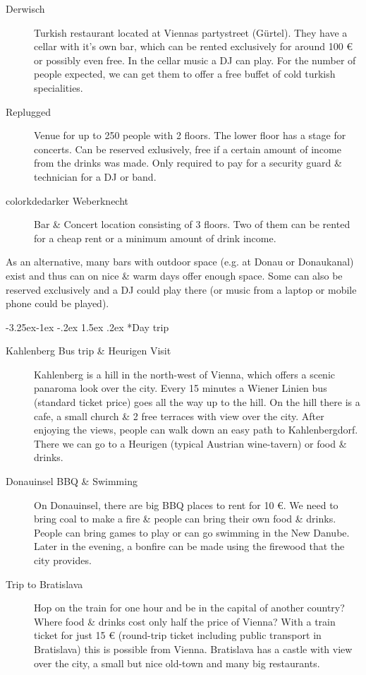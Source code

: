 \documentclass[10pt,a4paper]{article}
\makeatletter
\renewcommand\subsection{%
\@startsection{subsection}{2}{\z@}%
              {-3.25ex\@plus -1ex \@minus -.2ex}%
              {1.5ex \@plus .2ex}%
              {\color{kdelight}\sffamily\Large\bfseries}}
\makeatother
\begin{document}
\begin{description}
\item[\color{kdedarker} Derwisch] Turkish restaurant located at Viennas partystreet (Gürtel). They have a cellar with it's own bar, which can be rented exclusively for around 100 \euro{} or possibly even free. In the cellar music a DJ can play. For the number of people expected, we can get them to offer a free buffet of cold turkish specialities. 
\item[\color{kdedarker} Replugged] Venue for up to 250 people with 2 floors. The lower floor has a stage for concerts. Can be reserved exlusively, free if a certain amount of income from the drinks was made. Only required to pay for a security guard \& technician for a DJ or band.
\item[color{kdedarker} Weberknecht] Bar \& Concert location consisting of 3 floors. Two of them can be rented for a cheap rent or a minimum amount of drink income.
\end{description}

As an alternative, many bars with outdoor space (e.g. at Donau or Donaukanal) exist and thus can on nice \& warm days offer enough space. Some can also be reserved exclusively and a DJ could play there (or music from a laptop or mobile phone could be played).


\subsection*{Day trip}
\begin{description}
\item[\color{kdedarker} Kahlenberg Bus trip \& Heurigen Visit] Kahlenberg is a hill in the north-west of Vienna, which offers a scenic panaroma look over the city. Every 15 minutes a Wiener Linien bus (standard ticket price) goes all the way up to the hill. On the hill there is a cafe, a small church \& 2 free terraces with view over the city. After enjoying the views, people can walk down an easy path to Kahlenbergdorf. There we can go to a Heurigen (typical Austrian wine-tavern) or food \& drinks.
\item[\color{kdedarker} Donauinsel BBQ \& Swimming] On Donauinsel, there are big BBQ places to rent for 10 \euro{}. We need to bring coal to make a fire \& people can bring their own food \& drinks. People can bring games to play or can go swimming in the New Danube. Later in the evening, a bonfire can be made using the firewood that the city provides.
\item[\color{kdedarker} Trip to Bratislava] Hop on the train for one hour and be in the capital of another country? Where food \& drinks cost only half the price of Vienna? With a train ticket for just 15 \euro{} (round-trip ticket including public transport in Bratislava) this is possible from Vienna. Bratislava has a castle with view over the city, a small but nice old-town and many big restaurants.
\end{description}
\end{document}
